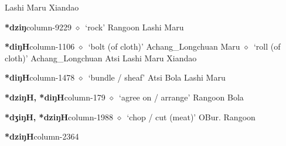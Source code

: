 \hspace{1ex}
         Lashi 
\hspace{1ex}
         Maru 
\hspace{1ex}
         Xiandao 
  \item {\footnotesize \textbf{*dziŋ}}{\tiny column-9229}
         $\diamond$~`rock'
         Rangoon 
\hspace{1ex}
         Lashi 
\hspace{1ex}
         Maru 
  \item {\footnotesize \textbf{*diŋH}}{\tiny column-1106}
         $\diamond$~`bolt (of cloth)'
         Achang\_Longchuan 
\hspace{1ex}
         Maru 
\hspace{1ex}
         $\diamond$~`roll (of cloth)'
         Achang\_Longchuan 
\hspace{1ex}
         Atsi 
\hspace{1ex}
         Lashi 
\hspace{1ex}
         Maru 
\hspace{1ex}
         Xiandao 
  \item {\footnotesize \textbf{*diŋH}}{\tiny column-1478}
         $\diamond$~`bundle / sheaf'
         Atsi 
\hspace{1ex}
         Bola 
\hspace{1ex}
         Lashi 
\hspace{1ex}
         Maru 
  \item {\footnotesize \textbf{*dziŋH, *diŋH}}{\tiny column-179}
         $\diamond$~`agree on / arrange'
         Rangoon 
\hspace{1ex}
         Bola 
  \item {\footnotesize \textbf{*dʒiŋH, *dziŋH}}{\tiny column-1988}
         $\diamond$~`chop / cut (meat)'
         OBur. 
\hspace{1ex}
         Rangoon 
  \item {\footnotesize \textbf{*dziŋH}}{\tiny column-2364}
